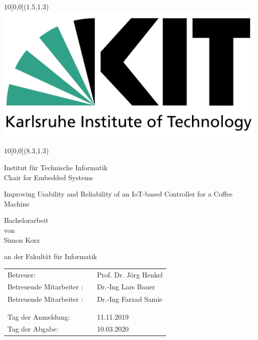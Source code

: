 
\newcommand{\changefont}[3]{\fontfamily{#1} \fontseries{#2} \fontshape{#3} \selectfont}

\newcommand{\diameter}{20}
\newcommand{\xone}{-60}
\newcommand{\xtwo}{440}
\newcommand{\yone}{60}
\newcommand{\ytwo}{-700}


\begin{titlepage}
\setlength{\oddsidemargin}{1cm}
\setlength{\topmargin}{-1cm}


\begin{textblock}{10}[0,0](1.5,1.3)
 \includegraphics[width=.3\textwidth]{KITlogo.pdf}
\end{textblock}
\begin{textblock}{10}[0,0](8.3,1.3)
\begin{flushleft}
\large Institut f\"{u}r Technische Informatik\\
Chair for Embedded Systems
  \end{flushleft}
\end{textblock}

\changefont{phv}{m}{n} %
\vspace*{3.5cm}
{
\centering
 \huge{Improving Usability and Reliability of an IoT-based Controller for a Coffee Machine}

 \vspace*{2cm}
 \large{Bachelorarbeit \\ von}\\
 \vspace*{1cm}
 \Large{Simon Korz}\\
 \vspace*{1cm}
 \normalsize{

 an der Fakult\"{a}t f\"{u}r Informatik\\
 }

\vspace*{3cm}
\normalsize{
\begin{tabular}[ht]{l c l}
   Betreuer: & \medskip  & Prof. Dr. J\"org Henkel\\
   Betreuende Mitarbeiter : &\medskip & Dr.-Ing Lars Bauer \\
   Betreuende Mitarbeiter : &\medskip & Dr.-Ing Farzad Samie \\
 & & \\
 & & \\
%
%
  Tag der Anmeldung: & \medskip  & 11.11.2019\\
  Tag der Abgabe: & \medskip & 10.03.2020\\


\end{tabular}}}
\end{titlepage}
